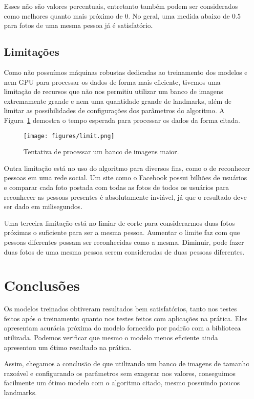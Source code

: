\documentclass[twoside,conference,a4paper]{IEEEtran}
\begin{document}
Esses não são valores percentuais, entretanto também podem ser considerados como melhores quanto mais próximo de 0. No geral, uma medida abaixo de 0.5 para fotos de uma mesma pessoa já é satisfatório.

\subsection{Limitações}
Como não possuímos máquinas robustas dedicadas ao treinamento dos modelos e nem GPU para processar os dados de forma mais eficiente, tivemos uma limitação de recursos que não nos permitiu utilizar um banco de imagens extremamente grande e nem uma quantidade grande de landmarks, além de limitar as possibilidades de configurações dos parâmetros do algoritmo. A Figura~\ref{fig:limit} demostra o tempo esperada para processar os dados da forma citada.

\begin{figure}
    \centering
    \texttt{[image: figures/limit.png]}
    \caption{Tentativa de processar um banco de imagens maior.}
    \label{fig:limit}
\end{figure}
Outra limitação está no uso do algoritmo para diversos fins, como o de reconhecer pessoas em uma rede social. Um site como o Facebook possui bilhões de usuários e comparar cada foto postada com todas as fotos de todos os usuários para reconhecer as pessoas presentes é absolutamente inviável, já que o resultado deve ser dado em milisegundos.

Uma terceira limitação está no limiar de corte para considerarmos duas fotos próximas o suficiente para ser a mesma pessoa. Aumentar o limite faz com que pessoas diferentes possam ser reconhecidas como a mesma. Diminuir, pode fazer duas fotos de uma mesma pessoa serem consideradas de duas pessoas diferentes.


\section{Conclusões}
Os modelos treinados obtiveram resultados bem satisfatórios, tanto nos testes feitos após o treinamento quanto nos testes feitos com  aplicações na prática. Eles apresentam acurácia próxima do modelo fornecido por padrão com a biblioteca utilizada. Podemos verificar que mesmo o modelo menos eficiente ainda apresentou um ótimo resultado na prática.

Assim, chegamos a conclusão de que utilizando um banco de imagens de tamanho razoável e configurando os parâmetros sem exagerar nos valores, conseguimos facilmente um ótimo modelo com o algoritmo citado, mesmo possuindo poucos landmarks.
\end{document}
